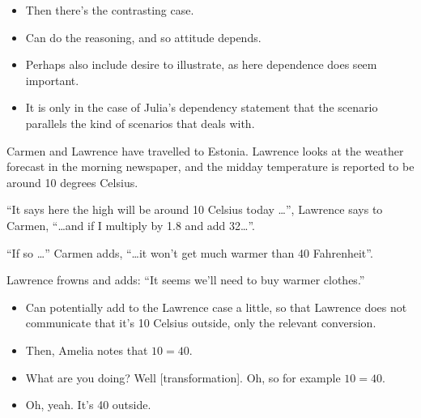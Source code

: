 \documentclass[10pt]{article}
\newcommand{\hozlinedash}[0]{%
  \noindent\hdashrule[0.5ex][c]{\textwidth}{.1pt}{2.5pt}
}
\begin{document}
\begin{itemize}
\item Then there's the contrasting case.
\item Can do the reasoning, and so attitude depends.
\item Perhaps also include desire to illustrate, as here dependence does seem important.
\end{itemize}

\begin{itemize}
\item It is only in the case of Julia's dependency statement that the scenario parallels the kind of scenarios that \citeauthor{Worsnip:2018aa} deals with.
\end{itemize}

\hozlinedash

\begin{scenario}
  Carmen and Lawrence have travelled to Estonia.
  Lawrence looks at the weather forecast in the morning newspaper, and the midday temperature is reported to be around 10 degrees Celsius.

  ``It says here the high will be around 10 Celsius today \dots'', Lawrence says to Carmen, ``\dots and if I multiply by 1.8 and add 32\dots''.

  ``If so \dots'' Carmen adds, ``\dots it won't get much warmer than 40 Fahrenheit''.

  Lawrence frowns and adds: ``It seems we'll need to buy warmer clothes.''
\end{scenario}

\hozlinedash

\begin{itemize}
\item Can potentially add to the Lawrence case a little, so that Lawrence does not communicate that it's 10 Celsius outside, only the relevant conversion.
\item Then, Amelia notes that \(10 = 40\).
\item What are you doing? Well [transformation]. Oh, so for example \(10 = 40\).
\item Oh, yeah. It's 40 outside.
\end{itemize}

\hozlinedash
\end{document}
